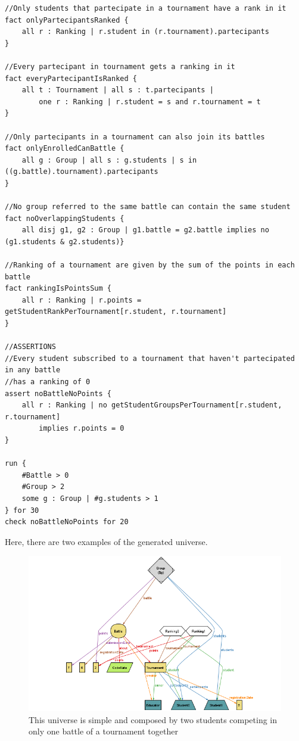 \documentclass[12pt, a4paper]{report}
\begin{document}
\begin{lstlisting}[language=alloy]
//Only students that partecipate in a tournament have a rank in it
fact onlyPartecipantsRanked {
    all r : Ranking | r.student in (r.tournament).partecipants
}

//Every partecipant in tournament gets a ranking in it
fact everyPartecipantIsRanked {
    all t : Tournament | all s : t.partecipants |
        one r : Ranking | r.student = s and r.tournament = t
}

//Only partecipants in a tournament can also join its battles
fact onlyEnrolledCanBattle {
    all g : Group | all s : g.students | s in ((g.battle).tournament).partecipants
}

//No group referred to the same battle can contain the same student
fact noOverlappingStudents {
    all disj g1, g2 : Group | g1.battle = g2.battle implies no (g1.students & g2.students)}

//Ranking of a tournament are given by the sum of the points in each battle 
fact rankingIsPointsSum {
    all r : Ranking | r.points = getStudentRankPerTournament[r.student, r.tournament]
}

//ASSERTIONS 
//Every student subscribed to a tournament that haven't partecipated in any battle 
//has a ranking of 0
assert noBattleNoPoints {
    all r : Ranking | no getStudentGroupsPerTournament[r.student, r.tournament] 
        implies r.points = 0
}

run {
    #Battle > 0
    #Group > 2
    some g : Group | #g.students > 1
} for 30
check noBattleNoPoints for 20
    \end{lstlisting}
    \newpage
    Here, there are two examples of the generated universe.
    \begin{figure}[H]
        \centering
        \includegraphics[width=0.8\linewidth]{images/AlloyGen2.png}
        \caption{This universe is simple and composed by two students competing in only one battle of a tournament together}
    \end{figure}
\end{document}
